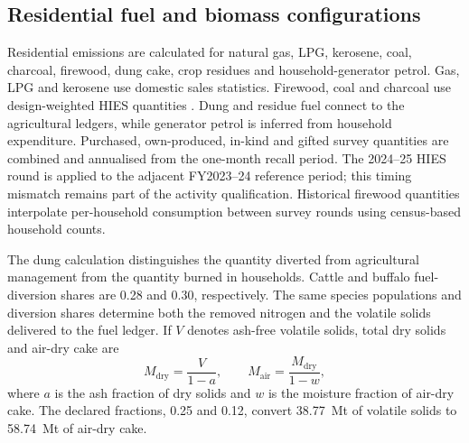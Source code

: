 \documentclass[essd]{copernicus}
\begin{document}
\subsection{Residential fuel and biomass configurations}
\label{sec:residential_methods}

Residential emissions are calculated for natural gas, LPG, kerosene, coal, charcoal, firewood, dung cake, crop residues and household-generator petrol. Gas, LPG and kerosene use domestic sales statistics. Firewood, coal and charcoal use design-weighted HIES quantities \citep{HIES2019,PBSHIES2026}. Dung and residue fuel connect to the agricultural ledgers, while generator petrol is inferred from household expenditure. Purchased, own-produced, in-kind and gifted survey quantities are combined and annualised from the one-month recall period. The 2024--25 HIES round is applied to the adjacent FY2023--24 reference period; this timing mismatch remains part of the activity qualification. Historical firewood quantities interpolate per-household consumption between survey rounds using census-based household counts.

The dung calculation distinguishes the quantity diverted from agricultural management from the quantity burned in households. Cattle and buffalo fuel-diversion shares are 0.28 and 0.30, respectively. The same species populations and diversion shares determine both the removed nitrogen and the volatile solids delivered to the fuel ledger. If $V$ denotes ash-free volatile solids, total dry solids and air-dry cake are
\begin{equation}
 M_{\mathrm{dry}}=\frac{V}{1-a},\qquad
 M_{\mathrm{air}}=\frac{M_{\mathrm{dry}}}{1-w},
 \label{eq:dung_mass_bases}
\end{equation}
where $a$ is the ash fraction of dry solids and $w$ is the moisture fraction of air-dry cake. The declared fractions, 0.25 and 0.12, convert 38.77~Mt of volatile solids to 58.74~Mt of air-dry cake.
\end{document}
